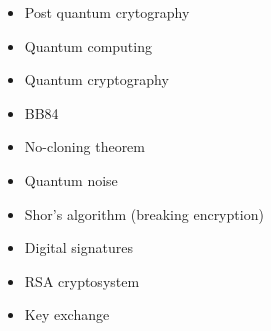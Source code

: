 \documentclass{article}
\begin{document}
\begin{itemize}
		\item Post quantum crytography
		\item Quantum computing
		\item Quantum cryptography
		\item BB84
		\item No-cloning theorem
		\item Quantum noise
		\item Shor's algorithm (breaking encryption)
		\item Digital signatures
		\item RSA cryptosystem
		\item Key exchange
\end{itemize}
\end{document}
